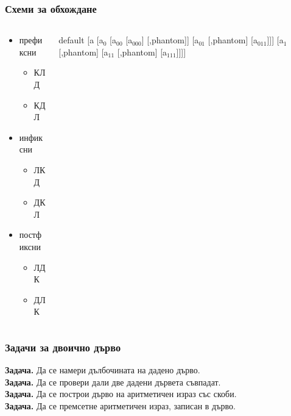 \documentclass{beamer}
\newcommand{\samplebintree}{%
      \begin{forest}
        default
        [a [a$_0$ [a$_{00}$ [a$_{000}$] [,phantom]] [a$_{01}$ [,phantom] [a$_{011}$]]] [a$_1$ [,phantom] [a$_{11}$ [,phantom] [a$_{111}$]]]]
      \end{forest}%
}
\begin{document}
\begin{frame}
  \frametitle{Схеми за обхождане}
  \begin{columns}[t,onlytextwidth]
    \begin{column}{0.35\textwidth}
      \begin{itemize}
      \item префиксни
        \begin{itemize}
        \item КЛД
        \item КДЛ
        \end{itemize}
      \item инфиксни
        \begin{itemize}
        \item ЛКД
        \item ДКЛ
        \end{itemize}
      \item постфиксни
        \begin{itemize}
        \item ЛДК
        \item ДЛК
        \end{itemize}
      \end{itemize}
    \end{column}
    \begin{column}{0.65\textwidth}
      \begin{center}
        \samplebintree
      \end{center}
    \end{column}
  \end{columns}
\end{frame}

\begin{frame}
  \frametitle{Задачи за двоично дърво}
  \textbf{Задача.} Да се намери дълбочината на дадено дърво.\\[2em]\pause
  \textbf{Задача.} Да се провери дали две дадени дървета съвпадат.\\[2em]\pause
  \textbf{Задача.} Да се построи дърво на аритметичен израз със скоби.\\[2em]\pause
  \textbf{Задача.} Да се премсетне аритметичен израз, записан в дърво.\\[2em]
\end{frame}
\end{document}
